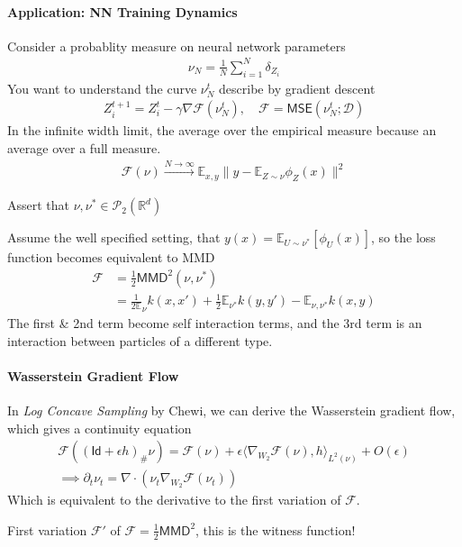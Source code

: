 \documentclass[11pt,fleqn]{article}
\numberwithin{equation}{section}
\theoremstyle{definition}
\theoremstyle{definition}
\begin{document}
\paragraph{Application: NN Training Dynamics}
Consider a probablity measure on neural network parameters
\begin{align}
	\nu_N = \frac{1}{N} \sum_{i=1}^N \delta_{Z_i}
\end{align}
You want to understand the curve $\nu_N^t$ describe by gradient descent
\begin{align}
	Z_i^{t+1} = Z_i^t - \gamma \nabla \mathcal F(\nu_N^t), \quad \mathcal F = \textsf{MSE}(\nu_N^t; \mathcal D)
\end{align}
In the infinite width limit, the average over the empirical measure because an average over a full measure.
\begin{align}
	\mathcal F(\nu) \overset{N \to \infty}{\to} \mathbb E_{x,y} \|y - \mathbb E_{Z \sim \nu} \phi_Z(x)\|^2
\end{align}
\begin{assumption}
	Assert that $\nu, \nu^* \in \mathcal P_2(\mathbb R^d)$
\end{assumption}
Assume the well specified setting, that $y(x) = \mathbb E_{U \sim \nu^*}[\phi_U(x)]$, so the loss function becomes equivalent to \textsf{MMD}
\begin{align}
	\mathcal F & = \frac{1}{2} \textsf{MMD}^2(\nu, \nu^*)\\
	& = \frac{1}{2 \mathbb E}_\nu k(x,x') + \frac{1}{2} \mathbb E_{\nu^*} k (y, y') - \mathbb E_{\nu, \nu^*} k(x,y)
\end{align}
The first \& 2nd term become self interaction terms, and the 3rd term is an interaction between particles of a different type.

\paragraph{Wasserstein Gradient Flow}
In \emph{Log Concave Sampling} by Chewi, we can derive the Wasserstein gradient flow, which gives a continuity equation
\begin{align}
	\mathcal F((\textsf{Id} + \epsilon h)_{\#} \nu ) = \mathcal F(\nu) + \epsilon \langle \nabla_{W_2} \mathcal F(\nu), h\rangle_{L^2(\nu)} + O(\epsilon)\\
	\implies \partial_t \nu_t = \nabla \cdot (\nu_t \nabla_{W_2} \mathcal F(\nu_t))
\end{align}
Which is equivalent to the derivative to the first variation of $\mathcal F$.
\begin{fact}
	First variation $\mathcal F'$ of $\mathcal F = \frac{1}{2} \textsf{MMD}^2$, this is the witness function! 
\end{fact}
\end{document}
